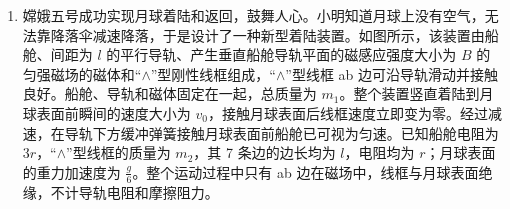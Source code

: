 \documentclass[\gkver]{gaokaozhenti}
\begin{document}
\begin{enumerate}
\begin{enumerate}
	\item
	若释放处高度 $h = h_{0}$，当小球第一次运动到圆管最低点 C 时，求速度大小 $v_{C}$ 及在此过程中所受合力的冲量 $I$ 的大小和方向；
	\item
	求小球在圆管内与圆心 $O_{1}$ 点等高的 D 点所受弹力 $F_{N}$ 与 $h$ 的关系式；
	\item
	若小球释放后能从原路返回到出发点，高度 $h$ 应该满足什么条件？
\end{enumerate}



\item
嫦娥五号成功实现月球着陆和返回，鼓舞人心。小明知道月球上没有空气，无法靠降落伞减速降落，于是设计了一种新型着陆装置。如图所示，该装置由船舱、间距为 $l$ 的平行导轨、产生垂直船舱导轨平面的磁感应强度大小为 $B$ 的匀强磁场的磁体和“$\wedge$”型刚性线框组成，“$\wedge$”型线框 ab 边可沿导轨滑动并接触良好。船舱、导轨和磁体固定在一起，总质量为 $m_{1}$。整个装置竖直着陆到月球表面前瞬间的速度大小为 $v_{0}$，接触月球表面后线框速度立即变为零。经过减速，在导轨下方缓冲弹簧接触月球表面前船舱已可视为匀速。已知船舱电阻为 $3r$，“$\wedge$”型线框的质量为 $m_{2}$，其 7 条边的边长均为 $l$，电阻均为 $r$；月球表面的重力加速度为 $\frac{g}{6}$。整个运动过程中只有 ab 边在磁场中，线框与月球表面绝缘，不计导轨电阻和摩擦阻力。


\end{enumerate}
\end{document}
